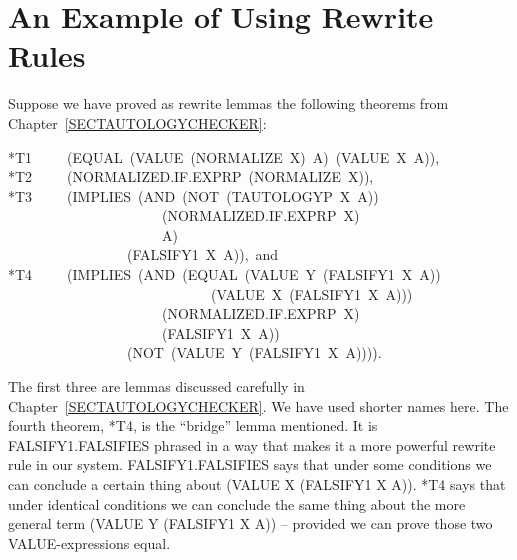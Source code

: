 \documentclass[11pt]{book}
\newenvironment{pubasis}{\begin{flushleft}\ttfamily\small}{\normalsize\rmfamily\end{flushleft}}
\newcommand{\pubdefaulttextsize}{\large}
\begin{document}
\section{An Example of Using Rewrite Rules}
\pubdefaulttextsize
Suppose we
have proved as rewrite lemmas the following theorems from
Chapter~\ref{SECTAUTOLOGYCHECKER}:
\begin{pubasis}
*T1~~~~~(EQUAL~(VALUE~(NORMALIZE~X)~A)~(VALUE~X~A)),\\

*T2~~~~~(NOR\-MAL\-IZED.IF.EXPRP~(NOR\-MAL\-IZE~X)),\\

*T3~~~~~(IMPLIES~(AND~(NOT~(TAUTOLOGYP~X~A))\\
~~~~~~~~~~~~~~~~~~~~~~(NOR\-MAL\-IZED.IF.EXPRP~X)\\
~~~~~~~~~~~~~~~~~~~~~~A)\\
~~~~~~~~~~~~~~~~~(FALSIFY1~X~A)),~and\\

*T4~~~~~(IMPLIES~(AND~(EQUAL~(VALUE~Y~(FALSIFY1~X~A))\\
~~~~~~~~~~~~~~~~~~~~~~~~~~~~~(VALUE~X~(FALSIFY1~X~A)))\\
~~~~~~~~~~~~~~~~~~~~~~(NOR\-MAL\-IZED.IF.EXPRP~X)\\
~~~~~~~~~~~~~~~~~~~~~~(FALSIFY1~X~A))\\
~~~~~~~~~~~~~~~~~(NOT~(VALUE~Y~(FALSIFY1~X~A)))).\\
\end{pubasis}
The first three are  lemmas discussed carefully in Chapter~\ref{SECTAUTOLOGYCHECKER}.
We have used shorter names here.
The fourth theorem, *T4, is  the ``bridge'' lemma mentioned.
It is  FAL\-SI\-FY1.FALSIFIES phrased in a way that makes it a
more powerful rewrite rule in our system.  FAL\-SI\-FY1.FALSIFIES says that under some conditions
we can conclude a certain thing about (VALUE X (FALSIFY1 X A)).
*T4 says that under identical conditions we can conclude the same
thing about the more general term (VALUE Y (FALSIFY1 X A)) -- provided
we can prove those two VALUE-expressions equal.
\end{document}
